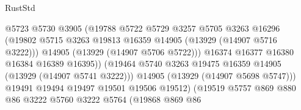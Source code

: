 \begin{lexlean}{RustStd}
\begin{coremodule}
                                            @5723
                                            @5730
                                            @3905
                                            (@19788
                                              @5722
                                              @5729
                                              @3257
                                              @5705
                                              @3263
                                              @16296
                                              (@19802
                                                @5715
                                                @3263
                                                @19813
                                                @16359
                                                @14905
                                                (@13929 (@14907 @5716 @3222)))
                                              @14905
                                              (@13929 (@14907 @5706 @5722)))
                                            @16374
                                            @16377
                                            @16380
                                            @16384
                                            @16389
                                            @16395))
                                        (@19464
                                          @5740
                                          @3263
                                          @19475
                                          @16359
                                          @14905
                                          (@13929 (@14907 @5741 @3222)))
                                        @14905
                                        (@13929 (@14907 @5698 @5747)))
                                      @19491
                                      @19494
                                      @19497
                                      @19501
                                      @19506
                                      @19512)
                                    (@19519
                                      @5757
                                      @869
                                      @880
                                      @86
                                      @3222
                                      @5760
                                      @3222
                                      @5764
                                      (@19868
                                        @869
                                        @86

\end{coremodule}
\end{lexlean}
